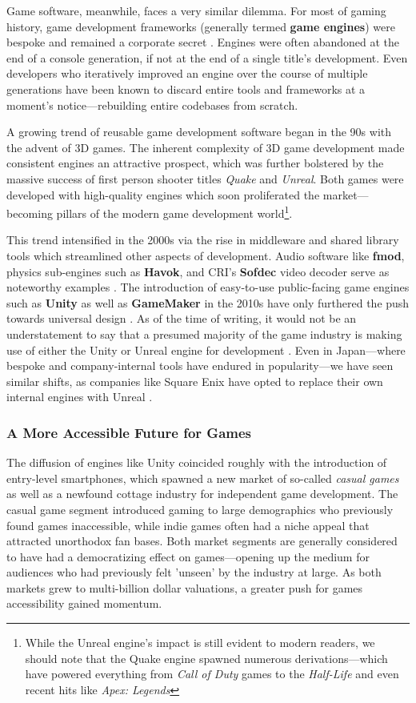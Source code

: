 \documentclass{report}
\newcommand{\tech}[1]{\textbf{#1}}
\begin{document}
Game software, meanwhile, faces a very similar dilemma. For most of gaming history, game development frameworks (generally termed \tech{game engines}) were bespoke and remained a corporate secret \cite{gregory2018game}. Engines were often abandoned at the end of a console generation, if not at the end of a single title's development. Even developers who iteratively improved an engine over the course of multiple generations have been known to discard entire tools and frameworks at a moment's notice---rebuilding entire codebases from scratch.  

A growing trend of reusable game development software began in the 90s with the advent of 3D games. The inherent complexity of 3D game development made consistent engines an attractive prospect, which was further bolstered by the massive success of first person shooter titles \emph{Quake} and \emph{Unreal}. Both games were developed with high-quality engines which soon proliferated the market---becoming pillars of the modern game development world\footnote{While the Unreal engine's impact is still evident to modern readers, we should note that the Quake engine spawned numerous derivations---which have powered everything from \emph{Call of Duty} games to the \emph{Half-Life} and even recent hits like \emph{Apex: Legends}}.

This trend intensified in the 2000s via the rise in middleware and shared library tools which streamlined other aspects of development. Audio software like \tech{fmod}, physics sub-engines such as \tech{Havok}, and CRI's \tech{Sofdec} video decoder serve as noteworthy examples \cite{Foley_2015}. The introduction of easy-to-use public-facing game engines such as \tech{Unity} as well as \tech{GameMaker} in the 2010s have only furthered the push towards universal design \cite{Cobbett_2017}. As of the time of writing, it would not be an understatement to say that a presumed majority of the game industry is making use of either the Unity or Unreal engine for development \cite{CBResearch_2018}. Even in Japan---where bespoke and company-internal tools have endured in popularity---we have seen similar shifts, as companies like Square Enix have opted to replace their own internal engines with Unreal \cite{Sinclair_2012}.

\subsubsection{A More Accessible Future for Games}
The diffusion of engines like Unity coincided roughly with the introduction of entry-level smartphones, which spawned a new market of so-called \emph{casual games} as well as a newfound cottage industry for independent game development. The casual game segment introduced gaming to large demographics who previously found games inaccessible, while indie games often had a niche appeal that attracted unorthodox fan bases. Both market segments are generally considered to have had a democratizing effect on games---opening up the medium for audiences who had previously felt 'unseen' by the industry at large. As both markets grew to multi-billion dollar valuations, a greater push for games accessibility gained momentum. 
\end{document}
